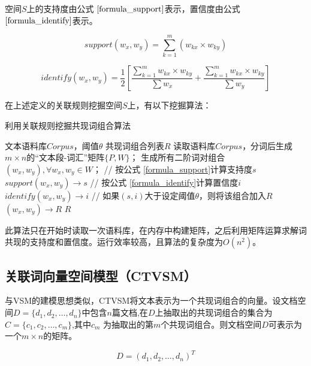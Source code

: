 空间\(S\)上的支持度由公式 \(\ref{formula_support}\)表示，置信度由公式
\(\ref{formula_identify}\)表示。

\begin{equation}
support(w_x, w_y) = \sum\limits_{k=1}^{m} (w_{kx} \times w_{ky}) 
\label{formula_support} 
\end{equation}

\begin{equation}
identify(w_x, w_y) = \frac{1}{2}\left [ 
\frac{\sum\limits_{k=1}^{m}w_{kx} \times w_{ky}}{\sum w_x} +
\frac{\sum\limits_{k=1}^{m}w_{kx} \times w_{ky}}{\sum w_y} 
\right ]
\label{formula_identify}
\end{equation}

在上述定义的关联规则挖掘空间\(S\)上，有以下挖掘算法：

\begin{algorithm}[htb]
\caption{利用关联规则挖掘共现词组合算法}
\label{alg:co_word}
\begin{algorithmic}[1]
\REQUIRE 文本语料库$Corpus$，阈值$\theta$
\ENSURE 共现词组合列表$R$
\STATE 读取语料库$Corpus$，分词后生成$m \times n$的“文本段-词汇”矩阵$\{ P, W\}$；
\STATE 生成所有二阶词对组合$(w_x, w_y), \forall w_x, w_y \in W$；
    \STATE // 按公式 \ref{formula_support}计算支持度$s$
    \STATE $support(w_x, w_y) \to s$
    \STATE // 按公式 \ref{formula_identify}计算置信度$i$ 
    \STATE $identify(w_x, w_y) \to i$     
    \STATE // 如果$(s,i)$大于设定阈值$\theta$，则将该组合加入$R$
        \STATE $(w_x, w_y) \to R$
    \ENDIF
\ENDFOR
\RETURN $R$
\end{algorithmic}
\end{algorithm}

此算法只在开始时读取一次语料库，在内存中构建矩阵，之后利用矩阵运算求解词共现的支持度和置信度。运行效率较高，且算法的复杂度为\(O(n^2)\)。

\subsection{关联词向量空间模型（CTVSM）}\label{ux5173ux8054ux8bcdux5411ux91cfux7a7aux95f4ux6a21ux578bctvsm}

与VSM的建模思想类似，CTVSM将文本表示为一个共现词组合的向量。设文档空间\(D = \{d_1,d_2, \ldots,d_n\}\)中包含\(n\)篇文档,在\(D\)上抽取出的共现词组合的集合为\(C=\{c_1,c_2, \ldots,c_m \}\),其中\(c_m\)
为抽取出的第\(m\)个共现词组合。则文档空间\(D\)可表示为一个\(m \times n\)的矩阵。

\begin{equation}
D = (d_1, d_2, \ldots, d_n)^T
\end{equation}

